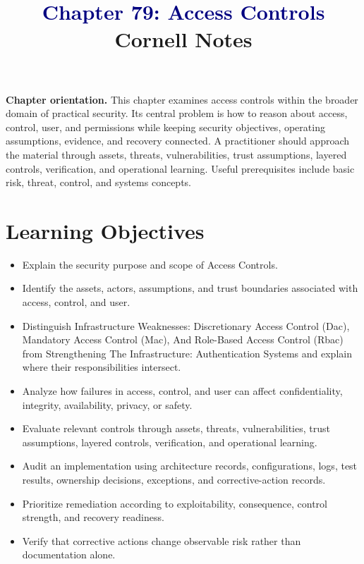 \documentclass[11pt]{article}
\title{\textcolor{Navy}{Chapter 79: Access Controls}\\[2mm]\large Cornell Notes}
\author{}
\date{}
\begin{document}
\maketitle
\thispagestyle{fancy}
\vspace{-1.5em}
\begin{orientationbox}
\textbf{Chapter orientation.} This chapter examines access controls within the broader domain of practical security. Its central problem is how to reason about access, control, user, and permissions while keeping security objectives, operating assumptions, evidence, and recovery connected. A practitioner should approach the material through assets, threats, vulnerabilities, trust assumptions, layered controls, verification, and operational learning. Useful prerequisites include basic risk, threat, control, and systems concepts.
\end{orientationbox}
\section*{Learning Objectives}
\begin{itemize}
\item Explain the security purpose and scope of Access Controls.
\item Identify the assets, actors, assumptions, and trust boundaries associated with access, control, and user.
\item Distinguish Infrastructure Weaknesses: Discretionary Access Control (Dac), Mandatory Access Control (Mac), And Role-Based Access Control (Rbac) from Strengthening The Infrastructure: Authentication Systems and explain where their responsibilities intersect.
\item Analyze how failures in access, control, and user can affect confidentiality, integrity, availability, privacy, or safety.
\item Evaluate relevant controls through assets, threats, vulnerabilities, trust assumptions, layered controls, verification, and operational learning.
\item Audit an implementation using architecture records, configurations, logs, test results, ownership decisions, exceptions, and corrective-action records.
\item Prioritize remediation according to exploitability, consequence, control strength, and recovery readiness.
\item Verify that corrective actions change observable risk rather than documentation alone.
\end{itemize}
\end{document}
